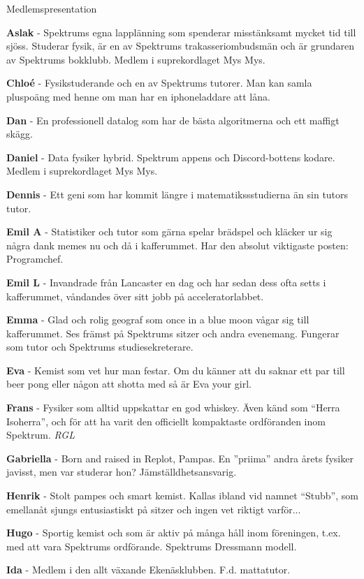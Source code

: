 \documentclass{spektraklet}
\begin{document}
\begin{artikel}{Medlemspresentation}{}
\begin{twocolumns}
\textbf{Aslak} - Spektrums egna lapplänning som spenderar misstänksamt mycket tid till sjöss. Studerar fysik, är en av Spektrums trakasseriombudsmän och är grundaren av Spektrums bokklubb. Medlem i suprekordlaget Mys Mys.

\textbf{Chloé} - Fysikstuderande och en av Spektrums tutorer. Man kan samla pluspoäng med henne om man har en iphoneladdare att låna.

\textbf{Dan} - En professionell datalog som har de bästa algoritmerna och ett maffigt skägg. %

\textbf{Daniel} - Data fysiker hybrid. Spektrum appens och Discord-bottens kodare. Medlem i suprekordlaget Mys Mys.

\textbf{Dennis} - Ett geni som har kommit längre i matematikssstudierna än sin tutors tutor.

\textbf{Emil A} - Statistiker och tutor som gärna spelar brädspel och kläcker ur sig några dank memes nu och då i kafferummet. Har den absolut viktigaste posten: Programchef.

\textbf{Emil L} - Invandrade från Lancaster en dag och har sedan dess ofta setts i kafferummet, våndandes över sitt jobb på acceleratorlabbet.

\textbf{Emma} - Glad och rolig geograf som once in a blue moon vågar sig till kafferummet. Ses främst på Spektrums sitzer och andra evenemang. Fungerar som tutor och Spektrums studiesekreterare.

\textbf{Eva} - Kemist som vet hur man festar. Om du känner att du saknar ett par till beer pong eller någon att shotta med så är Eva your girl.

\textbf{Frans} - Fysiker som alltid uppskattar en god whiskey. Även känd som ``Herra Isoherra'', och för att ha varit den officiellt kompaktaste ordföranden inom Spektrum. \emph{RGL}

\textbf{Gabriella} - Born and raised in Replot, Pampas. En ''priima'' andra årets fysiker javisst, men var studerar hon? Jämställdhetsansvarig.

\textbf{Henrik} - Stolt pampes och smart kemist. Kallas ibland vid namnet “Stubb”, som emellanåt sjungs entusiastiskt på sitzer och ingen vet riktigt varför... %

\textbf{Hugo} - Sportig kemist och som är aktiv på många håll inom föreningen, t.ex. med att vara Spektrums ordförande. Spektrums Dressmann modell.

\textbf{Ida} - Medlem i den allt växande Ekenäsklubben. F.d. mattatutor. %


\end{twocolumns}
\end{artikel}
\end{document}
